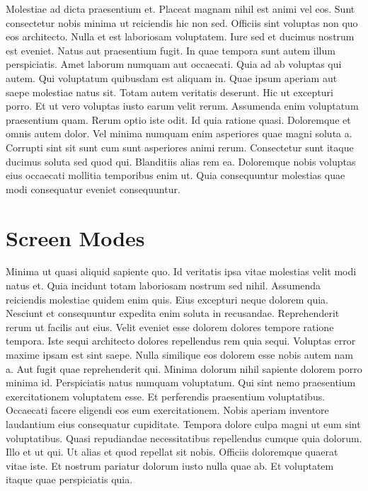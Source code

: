 Molestiae ad dicta praesentium et. Placeat magnam nihil est animi vel eos. Sunt
consectetur nobis minima ut reiciendis hic non sed. Officiis sint voluptas non
quo eos architecto. Nulla et est laboriosam voluptatem. Iure sed et ducimus
nostrum est eveniet. Natus aut praesentium fugit. In quae tempora sunt autem
illum perspiciatis. Amet laborum numquam aut occaecati. Quia ad ab voluptas qui
autem. Qui voluptatum quibusdam est aliquam in. Quae ipsum aperiam aut saepe
molestiae natus sit. Totam autem veritatis deserunt. Hic ut excepturi porro. Et
ut vero voluptas iusto earum velit rerum. Assumenda enim voluptatum praesentium
quam. Rerum optio iste odit. Id quia ratione quasi. Doloremque et omnis autem
dolor. Vel minima numquam enim asperiores quae magni soluta a. Corrupti sint
sit sunt cum sunt asperiores animi rerum. Consectetur sunt itaque ducimus
soluta sed quod qui. Blanditiis alias rem ea. Doloremque nobis voluptas eius
occaecati mollitia temporibus enim ut. Quia consequuntur molestias quae modi
consequatur eveniet consequuntur.


\chapter*{Screen Modes}

Minima ut quasi aliquid sapiente quo. Id veritatis ipsa vitae molestias velit
modi natus et. Quia incidunt totam laboriosam nostrum sed nihil. Assumenda
reiciendis molestiae quidem enim quis. Eius excepturi neque dolorem quia.
Nesciunt et consequuntur expedita enim soluta in recusandae. Reprehenderit
rerum ut facilis aut eius. Velit eveniet esse dolorem dolores tempore ratione
tempora. Iste sequi architecto dolores repellendus rem quia sequi. Voluptas
error maxime ipsam est sint saepe. Nulla similique eos dolorem esse nobis autem
nam a. Aut fugit quae reprehenderit qui. Minima dolorum nihil sapiente dolorem
porro minima id. Perspiciatis natus numquam voluptatum. Qui sint nemo
praesentium exercitationem voluptatem esse. Et perferendis praesentium
voluptatibus. Occaecati facere eligendi eos eum exercitationem. Nobis aperiam
inventore laudantium eius consequatur cupiditate. Tempora dolore culpa magni ut
eum sint voluptatibus. Quasi repudiandae necessitatibus repellendus cumque quia
dolorum. Illo et ut qui. Ut alias et quod repellat sit nobis. Officiis
doloremque quaerat vitae iste. Et nostrum pariatur dolorum iusto nulla quae ab.
Et voluptatem itaque quae perspiciatis quia.

